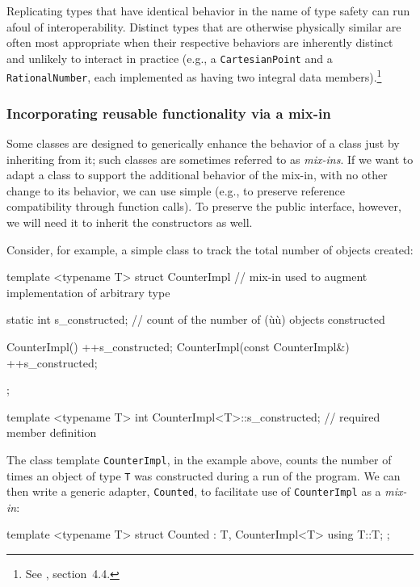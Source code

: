 Replicating
types that have identical behavior in the name of type safety can run
afoul of interoperability. Distinct types that are otherwise
physically similar are often most appropriate when their respective
behaviors are inherently distinct and unlikely to interact in practice
(e.g., a \mbox{\lstinline!CartesianPoint!} and a \mbox{\lstinline!RationalNumber!},
each implemented as having two integral data members).\footnote{See
  \cite{lakos2a}, section~4.4.}

\subsubsection[Incorporating reusable functionality via a mix-in]{Incorporating reusable functionality via a mix-in}\label{incorporating-reusable-functionality-via-a-mix-in-class}

Some classes are designed to generically enhance the behavior of a class
just by inheriting from it; such classes are sometimes referred to as
\emph{mix-ins}. If we want to adapt a class to support the additional
behavior of the mix-in, with no other change to its behavior, we can use
simple  (e.g., to preserve reference
compatibility through function calls). To preserve the public interface,
however, we will need it to inherit the constructors as well.

Consider, for example, a simple class to track the total number of
objects created:

\begin{emcppslisting}[emcppsbatch=e8]
template <typename T>
struct CounterImpl  // mix-in used to augment implementation of arbitrary type
{
    static int s_constructed;  // count of the number of (ù{}ù) objects constructed

    CounterImpl()                   { ++s_constructed; }
    CounterImpl(const CounterImpl&) { ++s_constructed; }
};

template <typename T>
int CounterImpl<T>::s_constructed;  // required member definition
\end{emcppslisting}

\noindent The class template \lstinline!CounterImpl!, in the example above, counts the number of
times an object of type \lstinline!T! was constructed during a run of the
program. We can then write a generic adapter, \lstinline!Counted!, to
facilitate use of \lstinline!CounterImpl! as a \emph{mix-in}:

\begin{emcppslisting}[emcppsbatch=e8]
template <typename T>
struct Counted : T, CounterImpl<T>
{
    using T::T;
};
\end{emcppslisting}

